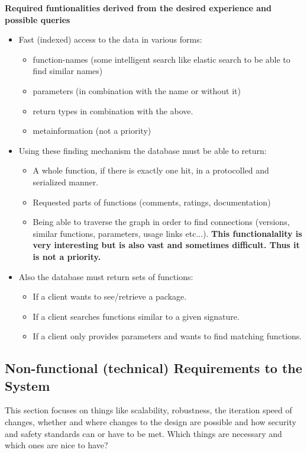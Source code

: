 \documentclass[twoside, 11pt]{scrartcl}
\begin{document}
\textbf{Required funtionalities derived from the desired experience and possible queries}
\begin{itemize}
	\item Fast (indexed) access to the data in various forms:
		\begin{itemize}
			\item function-names (some intelligent search like elastic search to be able to find similar names)
			\item parameters (in combination with the name or without it)
			\item return types in combination with the above.
			\item metainformation (not a priority)
		\end{itemize}		 
	\item Using these finding mechanism the database must be able to return:\
	\begin{itemize}
		\item A whole function, if there is exactly one hit, in a protocolled and serialized manner.
		\item Requested parts of functions (comments, ratings, documentation)
		\item Being able to traverse the graph in order to find connections (versions, similar functions, parameters, usage links etc...). \textbf{This functionalality is very interesting but is also vast and sometimes difficult. Thus it is not a priority.}
	\end{itemize}
	\item Also the database must return sets of functions:
	\begin{itemize}
		\item If a client wants to see/retrieve a package.
		\item If a client searches functions similar to a given signature.
		\item If a client only provides parameters and wants to find matching functions.
	\end{itemize}
\end{itemize}


\subsection{Non-functional (technical) Requirements to the System}
This section focuses on things like scalability, robustness, the iteration speed of changes, whether and where changes to the design are possible and how security and safety standards can or have to be met. Which things are necessary and which ones are nice to have?\\
\end{document}
